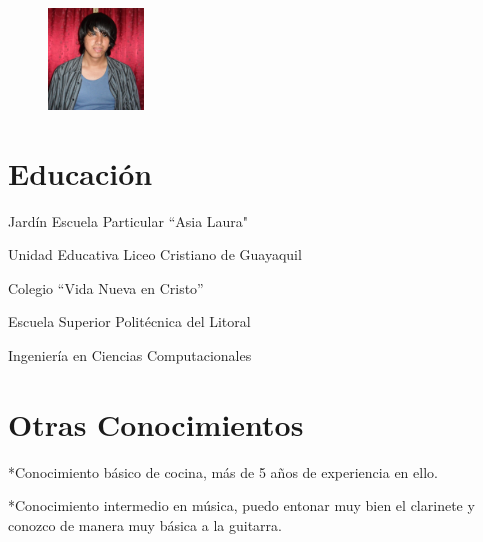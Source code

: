 \documentclass{res}
\begin{document}
\address{Sauces 8 Mz 454 Villa 2\\
\ \ \ \ Guayaquil-Ecuador\\
\ \ Contacto: 0842878XX}
\begin{figure}
\includegraphics[totalheight=1.2in,width=1in]{CVPicture} %
\end{figure}

\begin{resume}
\vspace{0.3in}
\section{\large Educaci\'on}
\vspace{0.1in}

       Jard\'in Escuela Particular ``Asia Laura"  

       Unidad Educativa Liceo Cristiano de Guayaquil
       \vspace{-0.15in} 

       \hspace{1in} Colegio ``Vida Nueva en Cristo''  

       Escuela Superior Polit\'ecnica del Litoral  

       \vspace{-0.15in} 

       \hfill{Ingenier\'ia en Ciencias Computacionales} 

\vspace{-0.15in}
\section{\large Otras Conocimientos}
\vspace{0.1in}
       *Conocimiento b\'asico de cocina, m\'as de 5 a\~nos de experiencia en ello. 

       *Conocimiento intermedio en m\'usica, puedo entonar muy bien el clarinete y conozco de manera muy b\'asica a la guitarra.


\end{resume}
\end{document}
